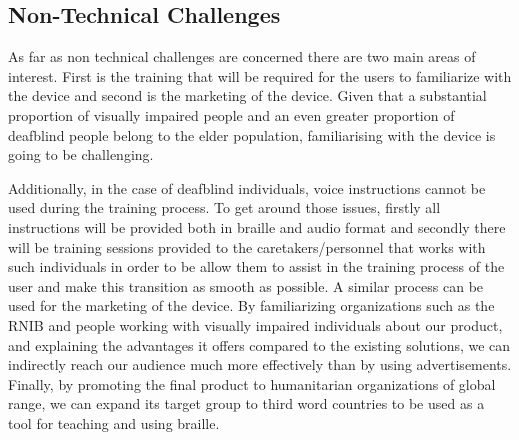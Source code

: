 \subsection{Non-Technical Challenges}
As far as non technical challenges are concerned there are two main areas of interest.
First is the training that will be required for the users to familiarize with the device and second is the marketing of the device.
Given that a substantial proportion of visually impaired people and an even greater proportion of deafblind people belong to the elder population, familiarising with the device is going to be challenging.

Additionally, in the case of deafblind individuals, voice instructions cannot be used during the training process.
To get around those issues, firstly all instructions will be provided both in braille and audio format and secondly there will be training sessions provided to the caretakers/personnel that works with such individuals in order to be allow them to assist in the training process of the user and make this transition as smooth as possible.
A similar process can be used for the marketing of the device.
By familiarizing organizations such as the RNIB and people working with visually impaired individuals about our product, and explaining the advantages it offers compared to the existing solutions, we can indirectly reach our audience much more effectively  than by using advertisements. Finally, by promoting the final product to humanitarian organizations of global range, we can expand its target group to third word countries to be used as a tool for teaching and using braille. 
 